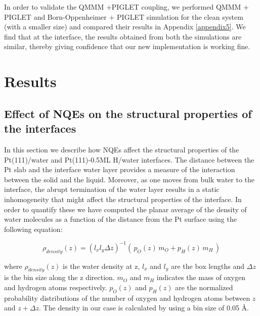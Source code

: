 In order to validate the QMMM $+$PIGLET coupling, we performed QMMM $+$ PIGLET and
Born-Oppenheimer $+$ PIGLET simulation for the clean system (with a smaller size) and
compared their results in Appendix \ref{appendix5}. We find that at the interface, 
the results obtained from both the simulations are similar, thereby giving
confidence that our new implementation is working fine.


\section{Results}
\label{resultss}
    

\subsection{Effect of NQEs on the structural properties of the interfaces}
\label{clean-yes}

In this section we describe how NQEs affect the structural properties
of the Pt(111)/water and Pt(111)-0.5ML H/water interfaces. The distance between the Pt slab and the interface water layer provides a measure of the interaction between the solid and the liquid. Moreover, as one moves from bulk water to the interface, the abrupt termination of the water layer results in a static inhomogeneity that might affect the
structural properties of the interface. In order to quantify these
we have computed the planar average of the density of water molecules as 
a function of the distance from the Pt surface using the following equation:

\begin{equation}
    \label{densitt}
    \rho_{density}(z) =(l_xl_y\Delta z)^{-1} (\, p_O (z) \, m_O + p_H (z) \,m_H \,)
\end{equation}

where $\rho_{density}(z)$ is the water density at z, $l_x$ and $l_y$ are the box lengths and $\Delta z$ is the bin size along the z direction. $m_O$ and $m_H$ indicates the mass of oxygen and hydrogen atoms respectively. $p_O (z)$ and  $p_H (z)$ are the normalized probability distributions of the number of oxygen and hydrogen atoms between $z$ and $z+\Delta z$. The density in our case is calculated by using a bin size of 0.05 \AA.


